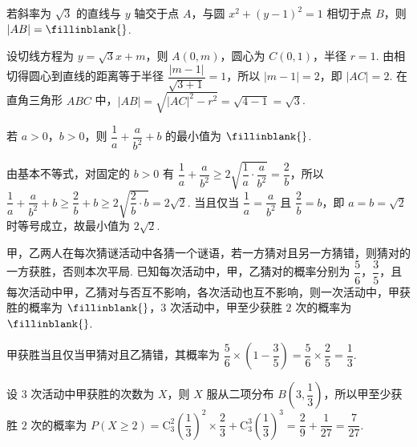 \begin{problem}
若斜率为 \( \sqrt3 \) 的直线与 \( y \) 轴交于点 \(A\)，与圆 \( x^2+\left( y-1 \right)^2=1 \) 相切于点 \(B\)，则 \( |AB|=\fillinblank{} \).
\end{problem}


\begin{solution}
设切线方程为 \(y=\sqrt3x+m\)，则 \(A(0,m)\)，圆心为 \(C(0,1)\)，半径 \(r=1\). 由相切得圆心到直线的距离等于半径 \(\dfrac{|m-1|}{\sqrt{3+1}}=1\)，所以 \(|m-1|=2\)，即 \(|AC|=2\). 在直角三角形 \(ABC\) 中，\(|AB|=\sqrt{|AC|^2-r^2}=\sqrt{4-1}=\sqrt3\).
\end{solution}

\begin{problem}
若 \( a>0 \)，\( b>0 \)，则 \( \dfrac{1}{a}+\dfrac{a}{b^2}+b \) 的最小值为 \(\fillinblank{}\).
\end{problem}


\begin{solution}
由基本不等式，对固定的 \(b>0\) 有 \(\dfrac1a+\dfrac{a}{b^2}\ge2\sqrt{\dfrac1a\cdot\dfrac{a}{b^2}}=\dfrac2b\)，所以 \(\dfrac1a+\dfrac{a}{b^2}+b\ge\dfrac2b+b\ge2\sqrt{\dfrac2b\cdot b}=2\sqrt2\). 当且仅当 \(\dfrac1a=\dfrac{a}{b^2}\) 且 \(\dfrac2b=b\)，即 \(a=b=\sqrt2\) 时等号成立，故最小值为 \(2\sqrt2\).
\end{solution}

\begin{problem}
甲，乙两人在每次猜谜活动中各猜一个谜语，若一方猜对且另一方猜错，则猜对的一方获胜，否则本次平局. 已知每次活动中，甲，乙猜对的概率分别为 \( \dfrac{5}{6} \)，\( \dfrac{3}{5} \)，且每次活动中甲，乙猜对与否互不影响，各次活动也互不影响，则一次活动中，甲获胜的概率为 \(\fillinblank{}\)，\( 3 \) 次活动中，甲至少获胜 \( 2 \) 次的概率为 \(\fillinblank{}\).
\end{problem}


\begin{solution}
甲获胜当且仅当甲猜对且乙猜错，其概率为 \(\dfrac56\times\left(1-\dfrac35\right)=\dfrac56\times\dfrac25=\dfrac13\).

设 \(3\) 次活动中甲获胜的次数为 \(X\)，则 \(X\) 服从二项分布 \(B\left(3,\dfrac13\right)\)，所以甲至少获胜 \(2\) 次的概率为 \(P(X\ge2)=\mathrm C_3^2\left(\dfrac13\right)^2\times\dfrac23+\mathrm C_3^3\left(\dfrac13\right)^3=\dfrac29+\dfrac1{27}=\dfrac7{27}\).
\end{solution}

